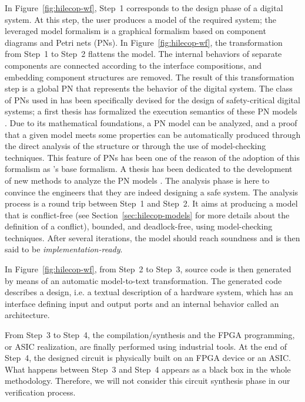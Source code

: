 \documentclass[pdflatex,sn-mathphys]{sn-jnl}%
\theoremstyle{thmstyleone}%
\theoremstyle{thmstyletwo}%
\theoremstyle{thmstylethree}%
\begin{document}
In Figure~\ref{fig:hilecop-wf}, Step~1 corresponds to the design phase
of a digital system. At this step, the user produces a model of the
required system; the leveraged model formalism is a graphical
formalism based on component diagrams and Petri nets (PNs).  In
Figure~\ref{fig:hilecop-wf}, the transformation from Step~1 to Step~2
flattens the model. The internal behaviors of separate components are
connected according to the interface compositions, and embedding
component structures are removed. The result of this transformation
step is a global PN that represents the behavior of the digital
system.  The class of PNs used in \hilecop{} has been specifically
devised for the design of safety-critical digital systems; a first
thesis has formalized the execution semantics of these PN models
\cite{Leroux2014}. %
Due to its mathematical
foundations, a PN model can be analyzed, and a proof that a given
model meets some properties can be automatically produced through the
direct analysis of the structure or through the use of model-checking
techniques. This feature of PNs has been one of the reason of the
adoption of this formalism as \hilecop{}'s base formalism. A thesis
has been dedicated to the development of new methods to analyze the
\hilecop{} PN models \cite{Merzoug2018}. The analysis phase is here to
convince the engineers that they are indeed designing a safe
system. The analysis process is a round trip between Step~1 and
Step~2.  It aims at producing a model that is conflict-free (see
Section~\ref{sec:hilecop-models} for more details about the definition
of a conflict), bounded, and deadlock-free, using model-checking
techniques.  After several iterations, the model should reach
soundness and is then said to be \emph{implementation-ready}.

In Figure~\ref{fig:hilecop-wf}, from Step~2 to Step~3, \vhdl{} source
code is then generated by means of an automatic model-to-text
transformation. The generated code describes a \vhdl{} design, i.e. a
textual description of a hardware system, which has an interface
defining input and output ports and an internal behavior called an
architecture.

From Step~3 to Step~4, the \vhdl{} compilation/synthesis and the FPGA
programming, or ASIC realization, are finally performed using
industrial tools. At the end of Step~4, the designed circuit is
physically built on an FPGA device or an ASIC.  What happens between
Step~3 and Step~4 appears as a black box in the whole \hilecop{}
methodology. Therefore, we will not consider this circuit synthesis
phase in our verification process.
\end{document}
